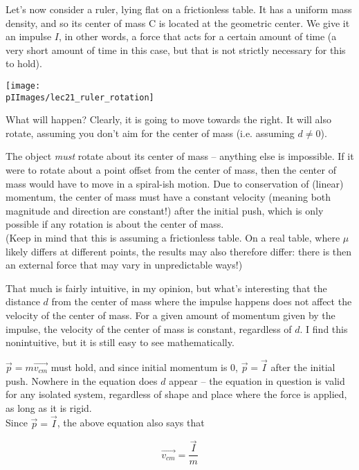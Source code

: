 Let's now consider a ruler, lying flat on a frictionless table. It has a uniform mass density, and so its center of mass C is located at the geometric center. We give it an impulse $I$, in other words, a force that acts for a certain amount of time (a very short amount of time in this case, but that is not strictly necessary for this to hold).

\begin{center}
\texttt{[image: \\pIImages/lec21\_ruler\_rotation]}
\end{center}

What will happen? Clearly, it is going to move towards the right. It will also rotate, assuming you don't aim for the center of mass (i.e. assuming $d \neq 0$).

The object \emph{must} rotate about its center of mass -- anything else is impossible. If it were to rotate about a point offset from the center of mass, then the center of mass would have to move in a spiral-ish motion. Due to conservation of (linear) momentum, the center of mass must have a constant velocity (meaning both magnitude and direction are constant!) after the initial push, which is only possible if any rotation is about the center of mass.\\
(Keep in mind that this is assuming a frictionless table. On a real table, where $\mu$ likely differs at different points, the results may also therefore differ: there is then an external force that may vary in unpredictable ways!)

That much is fairly intuitive, in my opinion, but what's interesting that the distance $d$ from the center of mass where the impulse happens does not affect the velocity of the center of mass. For a given amount of momentum given by the impulse, the velocity of the center of mass is constant, regardless of $d$. I find this nonintuitive, but it is still easy to see mathematically.

$\vec{p} = m \vec{v_{cm}}$ must hold, and since initial momentum is 0, $\vec{p} = \vec{I}$ after the initial push. Nowhere in the equation does $d$ appear -- the equation in question is valid for any isolated system, regardless of shape and place where the force is applied, as long as it is rigid.\\
Since $\vec{p} = \vec{I}$, the above equation also says that

\begin{equation}
\vec{v_{cm}} = \frac{\vec{I}}{m}
\end{equation}

